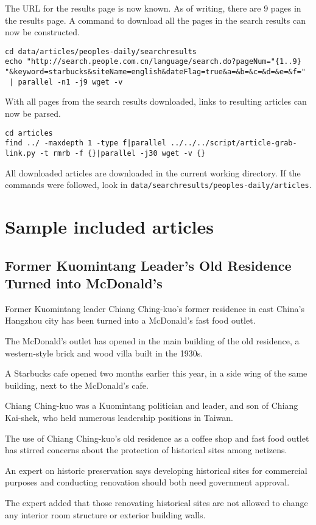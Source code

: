 The URL for the results page is now known. As of writing, there are 9 pages in
the results page. A command to download all the pages in the search results can
now be constructed.
\begin{verbatim}
cd data/articles/peoples-daily/searchresults
echo "http://search.people.com.cn/language/search.do?pageNum="{1..9}
"&keyword=starbucks&siteName=english&dateFlag=true&a=&b=&c=&d=&e=&f="
 | parallel -n1 -j9 wget -v
\end{verbatim}
With all pages from the search results downloaded, links to resulting articles
can now be parsed.
\begin{verbatim}
cd articles
find ../ -maxdepth 1 -type f|parallel ../../../script/article-grab-link.py -t rmrb -f {}|parallel -j30 wget -v {}
\end{verbatim}
All downloaded articles are downloaded in the current working directory. If the
commands were followed, look in
\texttt{data/searchresults/peoples-daily/articles}.

\chapter{Sample included articles}\label{appdx:news-articles-inc}

\section{Former Kuomintang Leader's Old Residence Turned into
McDonald's}

\begin{displayquote}
	Former Kuomintang leader Chiang Ching-kuo's former residence in east China's
	Hangzhou city has been turned into a McDonald's fast food outlet.

	The McDonald's outlet has opened in the main building of the old residence, a
	western-style brick and wood villa built in the 1930s.

	A Starbucks cafe opened two months earlier this year, in a side wing of the
	same building, next to the McDonald's cafe.

	Chiang Ching-kuo was a Kuomintang politician and leader, and son of Chiang
	Kai-shek, who held numerous leadership positions in Taiwan.

	The use of Chiang Ching-kuo's old residence as a coffee shop and fast food
	outlet has stirred concerns about the protection of historical sites among
	netizens.

	An expert on historic preservation says developing historical sites for
	commercial purposes and conducting renovation should both need government
	approval.

	The expert added that those renovating historical sites are not allowed to
	change any interior room structure or exterior building walls.
\end{displayquote}

